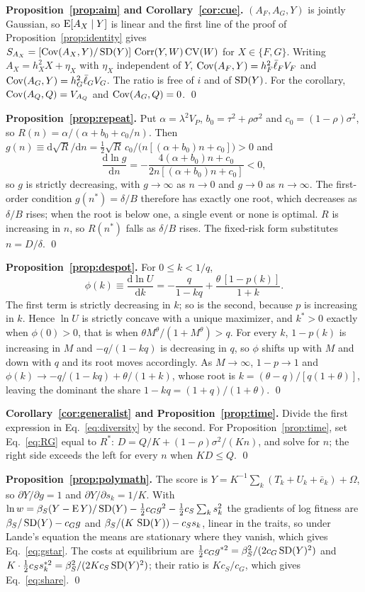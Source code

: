 \textbf{Proposition~\ref{prop:aim} and Corollary~\ref{cor:cue}.} $(A_F,A_G,Y)$ is jointly Gaussian, so $\operatorname{E}[A_X\mid Y]$ is
linear and the first line of the proof of Proposition~\ref{prop:identity} gives
$S_{A_X}=[\operatorname{Cov}(A_X,Y)/\operatorname{SD}(Y)]\,\operatorname{Corr}(Y,W)\operatorname{CV}(W)$ for $X\in\{F,G\}$. Writing $A_X=h_X^2X+\eta_X$ with $\eta_X$ independent of
$Y$, $\operatorname{Cov}(A_F,Y)=h_F^2\bar\ell_FV_F$ and $\operatorname{Cov}(A_G,Y)=h_G^2\bar\ell_GV_G$. The ratio is free of $i$ and of
$\operatorname{SD}(Y)$. For the corollary, $\operatorname{Cov}(A_Q,Q)=V_{A_Q}$ and $\operatorname{Cov}(A_G,Q)=0$. \qed

\textbf{Proposition~\ref{prop:repeat}.} Put $\alpha=\lambda^2V_P$, $b_0=\tau^2+\rho\sigma^2$ and $c_0=(1-\rho)\sigma^2$, so
$R(n)=\alpha/(\alpha+b_0+c_0/n)$. Then
$g(n)\equiv\mathrm d\sqrt{R}/\mathrm dn=\tfrac12\sqrt{R}\,c_0/\big(n[(\alpha+b_0)n+c_0]\big)>0$ and
\[
\frac{\mathrm d\ln g}{\mathrm dn}=-\frac{4(\alpha+b_0)n+c_0}{2n[(\alpha+b_0)n+c_0]}<0 ,
\]
so $g$ is strictly decreasing, with $g\to\infty$ as $n\to0$ and $g\to0$ as $n\to\infty$. The first-order condition
$g(n^*)=\delta/B$ therefore has exactly one root, which decreases as $\delta/B$ rises; when the root is below one, a single
event or none is optimal. $R$ is increasing in $n$, so $R(n^*)$ falls as $\delta/B$ rises. The fixed-risk form substitutes
$n=D/\delta$. \qed

\textbf{Proposition~\ref{prop:despot}.} For $0\le k<1/q$,
\[
\phi(k)\equiv\frac{\mathrm d\ln U}{\mathrm dk}=-\frac{q}{1-kq}+\frac{\theta\,[1-p(k)]}{1+k}.
\]
The first term is strictly decreasing in $k$; so is the second, because $p$ is increasing in $k$. Hence $\ln U$ is strictly
concave with a unique maximizer, and $k^*>0$ exactly when $\phi(0)>0$, that is when $\theta M^\theta/(1+M^\theta)>q$. For
every $k$, $1-p(k)$ is increasing in $M$ and $-q/(1-kq)$ is decreasing in $q$, so $\phi$ shifts up with $M$ and down with $q$
and its root moves accordingly. As $M\to\infty$, $1-p\to1$ and $\phi(k)\to-q/(1-kq)+\theta/(1+k)$, whose root is
$k=(\theta-q)/[q(1+\theta)]$, leaving the dominant the share $1-kq=(1+q)/(1+\theta)$. \qed

\textbf{Corollary~\ref{cor:generalist} and Proposition~\ref{prop:time}.} Divide the first expression in
Eq.~\eqref{eq:diversity} by the second. For Proposition~\ref{prop:time}, set Eq.~\eqref{eq:RG} equal to $R^*$:
$D=Q/K+(1-\rho)\sigma^2/(Kn)$, and solve for $n$; the right side exceeds the left for every $n$ when $KD\le Q$. \qed

\textbf{Proposition~\ref{prop:polymath}.} The score is $Y=K^{-1}\sum_k(T_k+U_k+\bar e_k)+\Omega$, so $\partial Y/\partial g=1$ and
$\partial Y/\partial s_k=1/K$. With $\ln w=\beta_S(Y-\operatorname{E} Y)/\operatorname{SD}(Y)-\tfrac12c_Gg^2-\tfrac12c_S\sum_ks_k^2$ the gradients of log
fitness are $\beta_S/\operatorname{SD}(Y)-c_Gg$ and $\beta_S/(K\,\operatorname{SD}(Y))-c_Ss_k$, linear in the traits, so under Lande's equation the means
are stationary where they vanish, which gives Eq.~\eqref{eq:gstar}. The costs at equilibrium are
$\tfrac12c_Gg^{*2}=\beta_S^2/(2c_G\operatorname{SD}(Y)^2)$ and $K\cdot\tfrac12c_Ss_k^{*2}=\beta_S^2/(2Kc_S\operatorname{SD}(Y)^2)$; their ratio is $Kc_S/c_G$,
which gives Eq.~\eqref{eq:share}. \qed

